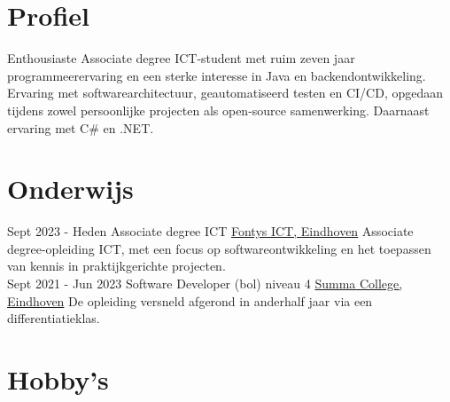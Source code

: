 \documentclass[letterpaper]{twentysecondcv_nederlands}
\begin{document}
\makesidebarFirst


\section{Profiel}

Enthousiaste Associate degree ICT-student met ruim zeven jaar
programmeerervaring en een sterke interesse in Java en backendontwikkeling.
Ervaring met softwarearchitectuur, geautomatiseerd testen en CI/CD,
opgedaan tijdens zowel persoonlijke projecten als open-source samenwerking.
Daarnaast ervaring met C\# en .NET.

\vspace{6mm}


\section{Onderwijs}

\begin{twenty}

    \twentyitem
    {Sept 2023 -}
    {Heden}
    {Associate degree ICT}
    {\href{https://www.fontys.nl/}{Fontys ICT, Eindhoven}}
    {}
    {
        Associate degree-opleiding ICT, met een focus op
        softwareontwikkeling en het toepassen van kennis
        in praktijkgerichte projecten.
    }\\

    \twentyitem
    {Sept 2021 -}
    {Jun 2023}
    {Software Developer (bol) niveau 4}
    {\href{https://www.summacollege.nl/}{Summa College, Eindhoven}}
    {}
    {
        De opleiding versneld afgerond in anderhalf jaar
        via een differentiatieklas.
    }

\end{twenty}


\section{Hobby's}
\end{document}
